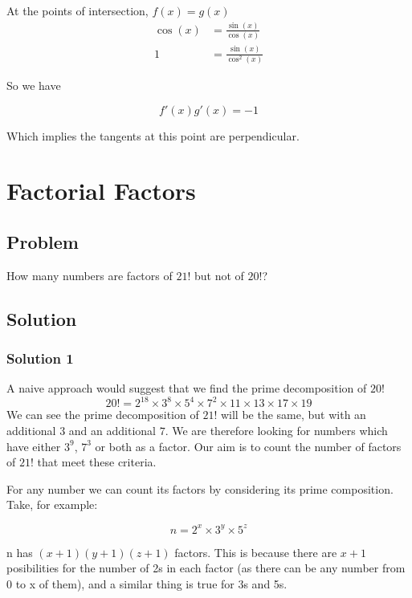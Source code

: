 \documentclass{book}
\begin{document}
At the points of intersection, \(f(x)=g(x)\)
\begin{align*}
  \cos(x)&=\frac{\sin(x)}{\cos(x)}\\
  1&=\frac{\sin(x)}{\cos^2(x)}
\end{align*}

So we have

\begin{equation*}
  f'(x)g'(x)=-1
\end{equation*}

Which implies the tangents at this point are perpendicular.

\section{Factorial Factors}
\subsection{Problem}
How many numbers are factors of \(21!\) but not of \(20!\)?
\subsection{Solution}
\subsubsection{Solution 1}
A naive approach would suggest that we find the prime decomposition of \(20!\)
\begin{equation*}
  20!=2^{18} \times 3^8 \times 5^4 \times 7^2 \times 11 \times 13 \times 17 \times 19
\end{equation*}
We can see the prime decomposition of \(21!\) will be the same, but with an additional \(3\) and an additional \(7\). We are therefore looking for numbers which have either \(3^9\), \(7^3\) or both as a factor. Our aim is to count the number of factors of \(21!\) that meet these criteria.

For any number we can count its factors by considering its prime composition. Take, for example:

\begin{equation*}
  n=2^x \times 3^y \times 5^z
\end{equation*}

n has \((x+1)(y+1)(z+1)\) factors. This is because there are \(x+1\) posibilities for the number of 2s in each factor (as there can be any number from 0 to x of them), and a similar thing is true for 3s and 5s.
\end{document}
